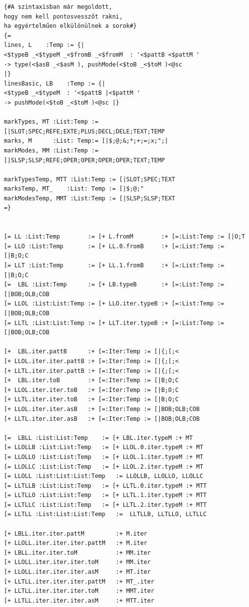 \begin{verbatim}
{#A szintaxisban már megoldott, 
hogy nem kell pontosvesszőt rakni, 
ha egyértelműen elkülönülnek a sorok#}
{=
lines, L    :Temp := {|
<$typeB _<$typeM _<$fromB _<$fromM  : '<$pattB <$pattM ' 
-> type(<$asB _<$asM ), pushMode(<$toB _<$toM )<@sc 
|}
linesBasic, LB    :Temp := {|
<$typeB _<$typeM  : '<$pattB |<$pattM ' 
-> pushMode(<$toB _<$toM )<@sc |}

markTypes, MT :List:Temp := [|SLOT;SPEC;REFE;EXTE;PLUS;DECL;DELE;TEXT;TEMP
marks, M	  :List: Temp:= [|$;@;&;*;+;=;x;";|
markModes, MM :List:Temp := [|SLSP;SLSP;REFE;OPER;OPER;OPER;OPER;TEXT;TEMP

markTypesTemp, MTT :List:Temp := [|SLOT;SPEC;TEXT
marksTemp, MT_	  :List: Temp := [|$;@;"
markModesTemp, MMT :List:Temp := [|SLSP;SLSP;TEXT
=}


[= LL :List:Temp 		:= [+ L.fromM 		 :+ [=:List:Temp := [|O;T
[= LLO :List:Temp 		:= [+ LL.0.fromB 	 :+ [=:List:Temp := [|B;O;C
[= LLT :List:Temp 		:= [+ LL.1.fromB 	 :+ [=:List:Temp := [|B;O;C
[= 	LBL :List:Temp 		:= [+ LB.typeB  	 :+ [=:List:Temp := [|BOB;OLB;COB
[= LLOL :List:List:Temp := [+ LLO.iter.typeB :+ [=:List:Temp := [|BOB;OLB;COB
[= LLTL :List:List:Temp := [+ LLT.iter.typeB :+ [=:List:Temp := [|BOB;OLB;COB

[+ 	LBL.iter.pattB 		:+ [=:Iter:Temp := [|{;[;<
[+ LLOL.iter.iter.pattB	:+ [=:Iter:Temp := [|{;[;<
[+ LLTL.iter.iter.pattB	:+ [=:Iter:Temp := [|{;[;<
[+  LBL.iter.toB   		:+ [=:Iter:Temp := [|B;O;C    
[+ LLOL.iter.iter.toB  	:+ [=:Iter:Temp := [|B;O;C
[+ LLTL.iter.iter.toB  	:+ [=:Iter:Temp := [|B;O;C
[+ LLOL.iter.iter.asB  	:+ [=:Iter:Temp := [|BOB;OLB;COB
[+ LLTL.iter.iter.asB  	:+ [=:Iter:Temp := [|BOB;OLB;COB
							
[= 	LBLL :List:List:Temp 	:= [+ LBL.iter.typeM :+ MT
[= LLOLLB :List:List:Temp 	:= [+ LLOL.0.iter.typeM :+ MT
[= LLOLLO :List:List:Temp 	:= [+ LLOL.1.iter.typeM :+ MT
[= LLOLLC :List:List:Temp 	:= [+ LLOL.2.iter.typeM :+ MT
[= LLOLL :List:List:List:Temp 	:= LLOLLB, LLOLLO, LLOLLC
[= LLTLLB :List:List:Temp 	:= [+ LLTL.0.iter.typeM :+ MTT
[= LLTLLO :List:List:Temp 	:= [+ LLTL.1.iter.typeM :+ MTT
[= LLTLLC :List:List:Temp 	:= [+ LLTL.2.iter.typeM :+ MTT
[= LLTLL :List:List:List:Temp 	:=  LLTLLB, LLTLLO, LLTLLC

[+ LBLL.iter.iter.pattM   		:+ M.iter
[+ LLOLL.iter.iter.iter.pattM   :+ M.iter
[+ LBLL.iter.iter.toM     		:+ MM.iter
[+ LLOLL.iter.iter.iter.toM     :+ MM.iter
[+ LLOLL.iter.iter.iter.asM     :+ MT.iter
[+ LLTLL.iter.iter.iter.pattM   :+ MT_.iter
[+ LLTLL.iter.iter.iter.toM     :+ MMT.iter
[+ LLTLL.iter.iter.iter.asM     :+ MTT.iter


\end{verbatim}
